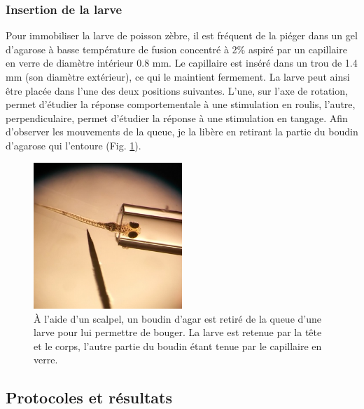 \subsubsection{Insertion de la larve}
Pour immobiliser la larve de poisson zèbre, il est fréquent de la piéger dans un gel d'agarose à basse température de fusion concentré à 2\% aspiré par un capillaire en verre de diamètre intérieur 0.8 mm. Le capillaire est inséré dans un trou de 1.4 mm (son diamètre extérieur), ce qui le maintient fermement. La larve peut ainsi être placée dans l'une des deux positions suivantes. L'une, sur l'axe de rotation, permet d'étudier la réponse comportementale à une stimulation en roulis, l'autre, perpendiculaire, permet d'étudier la réponse à une stimulation en tangage. Afin d'observer les mouvements de la queue, je la libère en retirant la partie du boudin d'agarose qui l'entoure (Fig. \ref{FIGagar}). 

\begin{figure}
    \centering
    \includegraphics[width=0.5\textwidth]{./files/prepa_larve.png}
    \caption{À l'aide d'un scalpel, un boudin d'agar est retiré de la queue d'une larve pour lui permettre de bouger. La larve est retenue par la tête et le corps, l'autre partie du boudin étant tenue par le capillaire en verre.
    \label{FIGagar}}
    \end{figure}

\subsection{Protocoles et résultats}

